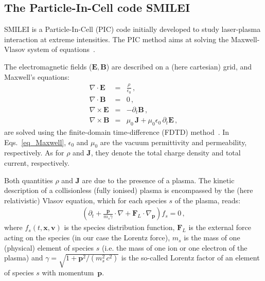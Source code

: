 \documentclass[11pt,a4paper]{article}
\newcommand{\vE}{\mathbf{E}}
\newcommand{\vB}{\mathbf{B}}
\newcommand{\vJ}{\mathbf{J}}
\newcommand{\vx}{\mathbf{x}}
\newcommand{\vp}{\mathbf{p}}
\newcommand{\vv}{\mathbf{v}}
\newcommand{\vF}{\mathbf{F}}
\begin{document}
\subsection*{The Particle-In-Cell code SMILEI}

SMILEI is a Particle-In-Cell (PIC) code initially developed to study laser-plasma interaction at extreme intensities. 
The PIC method aims at solving the Maxwell-Vlasov system of  equations~\cite{birdsall_langdon}.

The electromagnetic fields ($\vE,\vB$) are described on a (here cartesian) grid, and Maxwell's equations:
\begin{eqnarray}\label{eq_Maxwell}
\nabla \cdot \vE &=& \frac{\rho}{\epsilon_0} \,, \nonumber \\
\nabla \cdot \vB &=& 0 \,,\\
\nabla \times \vE &=& -\partial_t \vB \,, \nonumber\\
\nabla \times \vB &=& \mu_0\, \vJ + \mu_0 \epsilon_0\,\partial_t \vE \,, \nonumber
\end{eqnarray}
are solved using the finite-domain time-difference (FDTD) method~\cite{taflove_2005}.
In Eqs.~\eqref{eq_Maxwell}, $\epsilon_0$ and $\mu_0$ are the vacuum permittivity and permeability, respectively. 
As for $\rho$ and $\vJ$, they denote the total charge density and total current, respectively.

Both quantities $\rho$ and $\vJ$ are due to the presence of a plasma.
The kinetic description of a collisionless (fully ionised) plasma is encompassed by the (here relativistic) Vlasov equation, which for each species $s$ of the plasma, reads:
\begin{eqnarray}\label{eq_Vlasov}
\left(\partial_t  + \frac{\vp}{m_s \gamma} \cdot \nabla + \vF_L \cdot \nabla_{\vp} \right) f_s = 0\,,
\end{eqnarray}
where $f_s(t,\vx,\vv)$ is the species distribution function, $\vF_L$ is the external force acting on the species (in our case the Lorentz force), $m_s$ is the mass of one (physical) element of species $s$ (i.e. the mass of one ion or one electron of the plasma) and $\gamma = \sqrt{1+\vp^2/(m_s^2\,c^2)}$ is the so-called Lorentz factor of an element of species $s$ with momentum~$\vp$.
\end{document}
